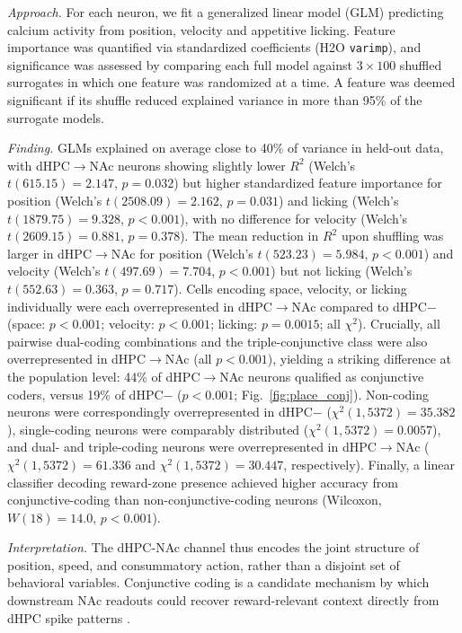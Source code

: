 \documentclass[11pt]{article}
\begin{document}
\textit{Approach.} For each neuron, we fit a generalized linear model (GLM) predicting calcium activity from position, velocity and appetitive licking. Feature importance was quantified via standardized coefficients (H2O \texttt{varimp}), and significance was assessed by comparing each full model against $3\times100$ shuffled surrogates in which one feature was randomized at a time. A feature was deemed significant if its shuffle reduced explained variance in more than 95\% of the surrogate models.

\textit{Finding.} GLMs explained on average close to 40\% of variance in held-out data, with dHPC$\rightarrow$NAc neurons showing slightly lower $R^2$ (Welch's $t(615.15)=2.147$, $p=0.032$) but higher standardized feature importance for position (Welch's $t(2508.09)=2.162$, $p=0.031$) and licking (Welch's $t(1879.75)=9.328$, $p<0.001$), with no difference for velocity (Welch's $t(2609.15)=0.881$, $p=0.378$). The mean reduction in $R^2$ upon shuffling was larger in dHPC$\rightarrow$NAc for position (Welch's $t(523.23)=5.984$, $p<0.001$) and velocity (Welch's $t(497.69)=7.704$, $p<0.001$) but not licking (Welch's $t(552.63)=0.363$, $p=0.717$). Cells encoding space, velocity, or licking individually were each overrepresented in dHPC$\rightarrow$NAc compared to dHPC$-$ (space: $p<0.001$; velocity: $p<0.001$; licking: $p=0.0015$; all $\chi^2$). Crucially, all pairwise dual-coding combinations and the triple-conjunctive class were also overrepresented in dHPC$\rightarrow$NAc (all $p<0.001$), yielding a striking difference at the population level: 44\% of dHPC$\rightarrow$NAc neurons qualified as conjunctive coders, versus 19\% of dHPC$-$ ($p<0.001$; Fig.~\ref{fig:place_conj}). Non-coding neurons were correspondingly overrepresented in dHPC$-$ ($\chi^2(1,5372)=35.382$), single-coding neurons were comparably distributed ($\chi^2(1,5372)=0.0057$), and dual- and triple-coding neurons were overrepresented in dHPC$\rightarrow$NAc ($\chi^2(1,5372)=61.336$ and $\chi^2(1,5372)=30.447$, respectively). Finally, a linear classifier decoding reward-zone presence achieved higher accuracy from conjunctive-coding than non-conjunctive-coding neurons (Wilcoxon, $W(18)=14.0$, $p<0.001$).

\textit{Interpretation.} The dHPC-NAc channel thus encodes the joint structure of position, speed, and consummatory action, rather than a disjoint set of behavioral variables. Conjunctive coding is a candidate mechanism by which downstream NAc readouts could recover reward-relevant context directly from dHPC spike patterns \citep{Xiao2020Conjunctive,Sato2020Overrepresentation}.
\end{document}
